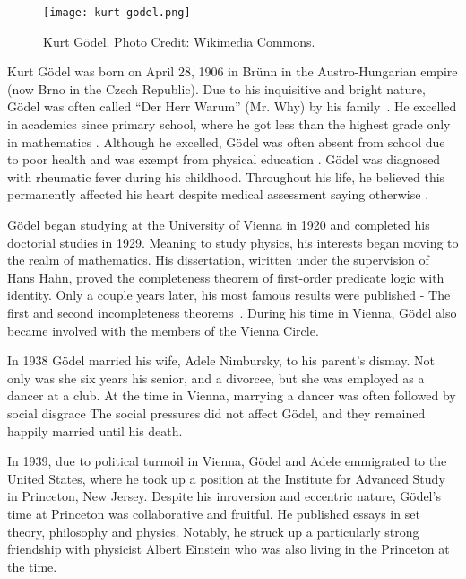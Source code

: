 \documentclass[../../../include/open-logic-section]{subfiles}
\begin{document}


\begin{figure}[h!] 
\centering
\texttt{[image: kurt-godel.png]} 
\caption{Kurt G{\"o}del. Photo Credit: Wikimedia Commons.} 
\end{figure}

Kurt G{\"o}del was born on April 28, 1906 in Br{\"u}nn in the
Austro-Hungarian empire (now Brno in the Czech Republic). Due to his
inquisitive and bright nature, G{\"o}del was often called ``Der Herr
Warum'' (Mr. Why) by his family~\citep[1]{Dawson1997}. He excelled in
academics since primary school, where he got less than the highest grade
only in mathematics \citep[15]{Dawson1997}. Although he excelled, G{\"o}del was
often absent from school due to poor health and was exempt from physical
education \citep[10]{Dawson1997}. G{\"o}del was diagnosed with rheumatic fever
during his childhood. Throughout his life, he believed this permanently
affected his heart despite medical assessment saying otherwise
\citep[11]{Dawson1997}.

G{\"o}del began studying at the University of Vienna in 1920 and completed his
doctorial studies in 1929. Meaning to study physics, his interests began
moving to the realm of mathematics. His dissertation,
wiritten under the supervision of Hans Hahn, proved the completeness
theorem of first-order predicate logic with identity. Only a couple years
later, his most famous results were published - The first and second
incompleteness theorems~\citep{Godel1931}. During his time in Vienna,
G{\"o}del also became involved with the members of the Vienna Circle.

In 1938 G{\"o}del married his wife, Adele Nimbursky, to his parent's dismay. Not
only was she six years his senior, and a divorcee, but she was employed as
a dancer at a club. At the time in Vienna, marrying a dancer was often
followed by social disgrace \citep[34]{Dawson1997} The social pressures did not
affect G{\"o}del, and they remained happily married until his death.

In 1939, due to political turmoil in Vienna, G{\"o}del and Adele emmigrated to
the United States, where he took up a position at the Institute for
Advanced Study in Princeton, New Jersey. Despite his inroversion and
eccentric nature, G{\"o}del's time at Princeton was collaborative and fruitful.
He published essays in set theory, philosophy and physics. Notably, he
struck up a particularly strong friendship with physicist Albert Einstein
who was also living in the Princeton at the time.
\end{document}
